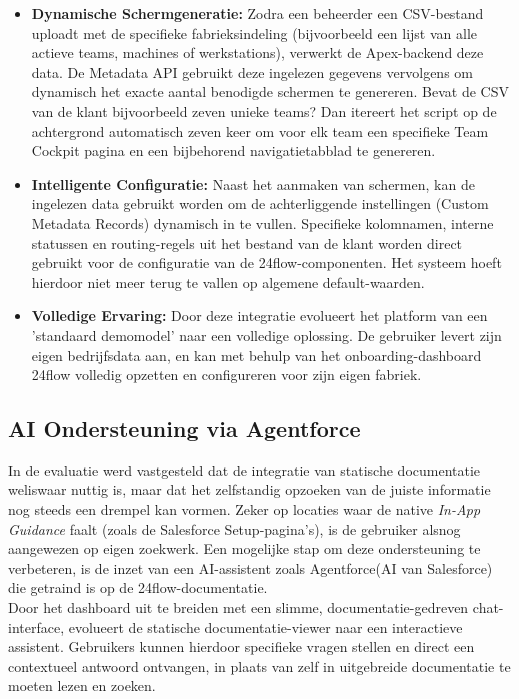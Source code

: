 \begin{itemize}
	\item \textbf{Dynamische Schermgeneratie:} Zodra een beheerder een CSV-bestand uploadt met de specifieke fabrieksindeling (bijvoorbeeld een lijst van alle actieve teams, machines of werkstations), verwerkt de Apex-backend deze data. De Metadata API gebruikt deze ingelezen gegevens vervolgens om dynamisch het exacte aantal benodigde schermen te genereren. Bevat de CSV van de klant bijvoorbeeld zeven unieke teams? Dan itereert het script op de achtergrond automatisch zeven keer om voor elk team een specifieke Team Cockpit pagina en een bijbehorend navigatietabblad te genereren.
	
	\item \textbf{Intelligente Configuratie:} Naast het aanmaken van schermen, kan de ingelezen data gebruikt worden om de achterliggende instellingen (Custom Metadata Records) dynamisch in te vullen. Specifieke kolomnamen, interne statussen en routing-regels uit het bestand van de klant worden direct gebruikt voor de configuratie van de 24flow-componenten. Het systeem hoeft hierdoor niet meer terug te vallen op algemene default-waarden.
	
	\item \textbf{Volledige Ervaring:} Door deze integratie evolueert het platform van een 'standaard demomodel' naar een volledige oplossing. De gebruiker levert zijn eigen bedrijfsdata aan, en kan met behulp van het onboarding-dashboard 24flow volledig opzetten en configureren voor zijn eigen fabriek.
\end{itemize}

\subsection{AI Ondersteuning via Agentforce}
\label{subsec:ai_gedreven_ondersteuning}

In de evaluatie werd vastgesteld dat de integratie van statische documentatie weliswaar nuttig is, maar dat het zelfstandig opzoeken van de juiste informatie nog steeds een drempel kan vormen. Zeker op locaties waar de native \textit{In-App Guidance} faalt (zoals de Salesforce Setup-pagina's), is de gebruiker alsnog aangewezen op eigen zoekwerk. Een mogelijke stap om deze ondersteuning te verbeteren, is de inzet van een AI-assistent zoals Agentforce(AI van Salesforce) die getraind is op de 24flow-documentatie.
\\

Door het dashboard uit te breiden met een slimme, documentatie-gedreven chat-interface, evolueert de statische documentatie-viewer naar een interactieve assistent. Gebruikers kunnen hierdoor specifieke vragen stellen en direct een contextueel antwoord ontvangen, in plaats van zelf in uitgebreide documentatie te moeten lezen en zoeken. 

